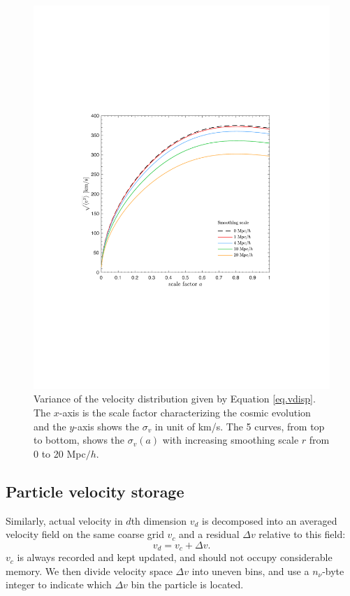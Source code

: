 \documentclass[10pt,twocolumn,preprint]{emulateapj}
\begin{document}
\begin{figure}
\centering
  \includegraphics[width=1\linewidth]{f1}
 \caption{Variance of the velocity distribution given by Equation \ref{eq.vdisp}. The $x$-axis is the scale factor characterizing the cosmic evolution and the $y$-axis shows the $\sigma_v$ in unit of km/s. The 5 curves, from top to bottom, shows the $\sigma_v(a)$ with increasing smoothing scale $r$ from 0 to 20 Mpc$/h$.}
\label{fig.vdisp}
\end{figure}

\subsection{Particle velocity storage}\label{ss.velocity}
Similarly, actual velocity in $d$th dimension $v_d$ is decomposed into an averaged velocity field on the same coarse grid $v_c$ and a residual $\Delta v$ relative to this field: 
\begin{equation}
	v_d=v_c+\Delta v.
\end{equation}
$v_c$ is always recorded and kept updated, and should not occupy considerable memory. We then divide velocity space $\Delta v$ into uneven bins, and use a $n_\nu$-byte integer to indicate which $\Delta v$ bin the particle is located.
\end{document}
